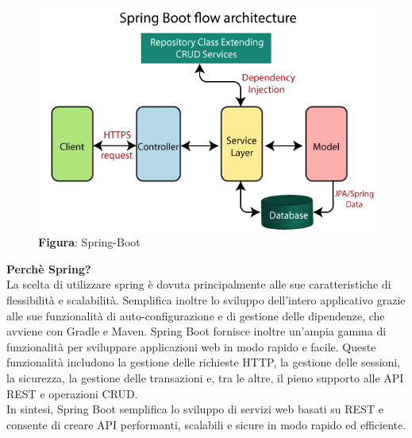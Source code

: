     \begin{figure}[H]
        \centering
        \includegraphics[scale=0.3]{assets/immagini varie/spring-boot-architecture2.png}
        \caption*{\textbf{Figura}: Spring-Boot}\label{fig:spring_Arch}
    \end{figure}

    \begin{flushleft}
        \textbf{Perchè Spring?}\\
        La scelta di utilizzare spring è dovuta principalmente alle sue caratteristiche di flessibilità e scalabilità. Semplifica inoltre lo sviluppo dell'intero applicativo
        grazie alle sue funzionalità di auto-configurazione e di gestione delle dipendenze, che avviene con Gradle e Maven. Spring Boot fornisce inoltre un'ampia gamma di funzionalità per sviluppare applicazioni web in modo rapido e facile. Queste funzionalità includono la gestione delle richieste HTTP, la gestione delle sessioni, la sicurezza, la gestione delle transazioni e, tra le altre, il pieno supporto alle API REST e operazioni CRUD.\\
        In sintesi, Spring Boot semplifica lo sviluppo di servizi web basati su REST e consente di creare API performanti, scalabili e sicure in modo rapido ed efficiente.
    \end{flushleft}
    

    \newpage

